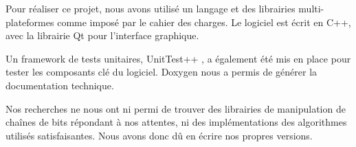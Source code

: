 Pour réaliser ce projet, nous avons utilisé un langage et des librairies multi-plateformes comme imposé par le cahier des charges. Le logiciel est écrit en C++, avec la librairie Qt \cite{Qt} pour l'interface graphique.

Un framework de tests unitaires, UnitTest++ \cite{UnitTest}, a également été mis en place pour tester les composants clé du logiciel. Doxygen \cite{Doxygen} nous a permis de générer la documentation technique.

Nos recherches ne nous ont ni permi de trouver des librairies de manipulation de chaînes de bits répondant à nos attentes, ni des implémentations des algorithmes utilisés satisfaisantes. Nous avons donc dû en écrire nos propres versions.
